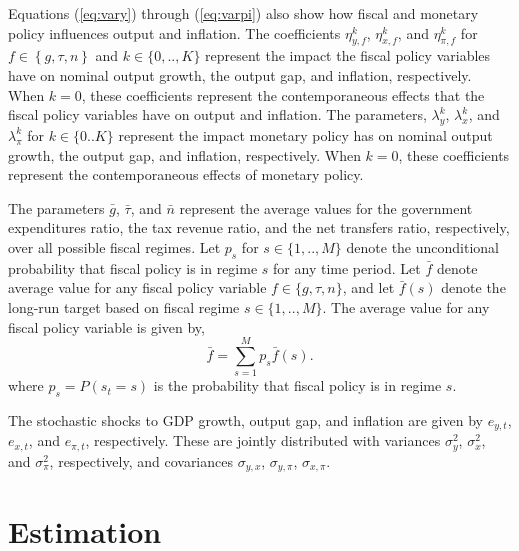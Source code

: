 \documentclass[11pt]{article}
\newcommand{\beq}{\begin{equation}}
\newcommand{\eeq}{\end{equation}}
\begin{document}
Equations (\ref{eq:vary}) through (\ref{eq:varpi}) also show how fiscal and monetary policy influences output and inflation.  The coefficients $\eta_{y,f}^k$, $\eta_{x,f}^k$, and $\eta_{\pi,f}^k$ for $f \in \left\{g,\tau,n\right\}$ and $k \in \{0,..,K\}$ represent the impact the fiscal policy variables have on nominal output growth, the output gap, and inflation, respectively.  When $k=0$, these coefficients represent the contemporaneous effects that the fiscal policy variables have on output and inflation.  The parameters, $\lambda_{y}^k$, $\lambda_{x}^k$, and $\lambda_{\pi}^k$ for $k \in \{0..K\}$ represent the impact monetary policy has on nominal output growth, the output gap, and inflation, respectively. When $k=0$, these coefficients represent the contemporaneous effects of monetary policy.

The parameters $\bar{g}$, $\bar{\tau}$, and $\bar{n}$ represent the average values for the government expenditures ratio, the tax revenue ratio, and the net transfers ratio, respectively, over all possible fiscal regimes.  Let $p_s$ for $s \in \{1,..,M\}$ denote the unconditional probability that fiscal policy is in regime $s$ for any time period.  Let $\bar{f}$ denote average value for any fiscal policy variable $f \in \{g,\tau,n\}$, and let $\bar{f}(s)$ denote the long-run target based on fiscal regime $s \in \{1,..,M\}$.  The average value for any fiscal policy variable is given by,
\beq \bar{f} = \sum_{s=1}^M p_s \bar{f}(s). \eeq
where $p_s = P(s_t=s)$ is the probability that fiscal policy is in regime $s$. 

The stochastic shocks to GDP growth, output gap, and inflation are given by $e_{y,t}$, $e_{x,t}$, and $e_{\pi,t}$, respectively.  These are jointly distributed with variances $\sigma_y^2$, $\sigma_x^2$, and $\sigma_\pi^2$, respectively, and covariances $\sigma_{y,x}$, $\sigma_{y,\pi}$, $\sigma_{x,\pi}$.

\section{Estimation}
\end{document}
